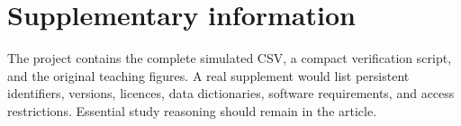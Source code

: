 \section{Supplementary information}
\label{app:supplement}

The project contains the complete simulated CSV, a compact verification script,
and the original teaching figures. A real supplement would list persistent
identifiers, versions, licences, data dictionaries, software requirements, and
access restrictions. Essential study reasoning should remain in the article.
